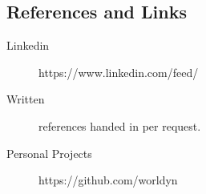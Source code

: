 \documentclass[margin,line,a4paper]{resume}
\begin{document}
\begin{resume}
\section{\mysidestyle References and Links}
\begin{description}
    \item[Linkedin] https://www.linkedin.com/feed/
    \item[Written] references handed in per request.
    \item[Personal Projects] https://github.com/worldyn
\end{description}

\end{resume}
\end{document}
